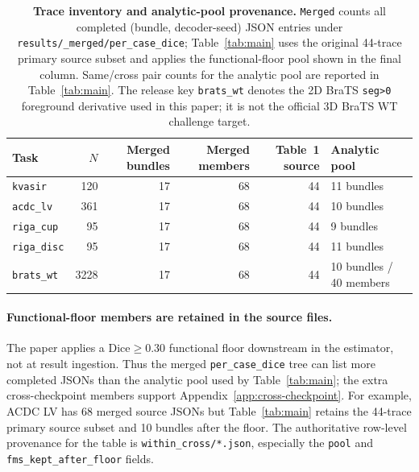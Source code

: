 \begin{table}[!htbp]
  \caption{\textbf{Trace inventory and analytic-pool provenance.}
  \texttt{Merged} counts all completed (bundle, decoder-seed) JSON entries under
  \texttt{results/\_merged/per\_case\_dice}; Table~\ref{tab:main} uses the
  original 44-trace primary source subset and applies the functional-floor
  pool shown in the final column. Same/cross pair counts for the analytic pool
  are reported in Table~\ref{tab:main}. The release key \texttt{brats\_wt}
  denotes the 2D BraTS \texttt{seg>0} foreground derivative used in this paper;
  it is not the official 3D BraTS WT challenge target.}
  \label{tab:release-manifest}
  \centering\scriptsize
  \setlength{\tabcolsep}{3pt}
  \begin{tabular*}{\linewidth}{@{\extracolsep{\fill}}lrrrrl}
    \toprule
    Task & $N$ & Merged bundles & Merged members & Table~1 source & Analytic pool \\
    \midrule
    \texttt{kvasir}     & 120  & 17 & 68 & 44 & 11 bundles \\
    \texttt{acdc\_lv}   & 361  & 17 & 68 & 44 & 10 bundles \\
    \texttt{riga\_cup}  & 95   & 17 & 68 & 44 & 9 bundles \\
    \texttt{riga\_disc} & 95   & 17 & 68 & 44 & 11 bundles \\
    \texttt{brats\_wt}  & 3228 & 17 & 68 & 44 & 10 bundles / 40 members \\
    \bottomrule
  \end{tabular*}
\end{table}

\paragraph{Functional-floor members are retained in the source files.}
The paper applies a Dice${\geq}0.30$ functional floor downstream in the
estimator, not at result ingestion. Thus the merged \texttt{per\_case\_dice}
tree can list more completed JSONs than the analytic pool used by
Table~\ref{tab:main}; the extra cross-checkpoint members support
Appendix~\ref{app:cross-checkpoint}. For example, ACDC LV has 68 merged
source JSONs but Table~\ref{tab:main} retains the 44-trace primary source subset
and 10 bundles after the floor. The authoritative row-level provenance for the
table is \texttt{within\_cross/*.json}, especially the \texttt{pool} and
\texttt{fms\_kept\_after\_floor} fields.

